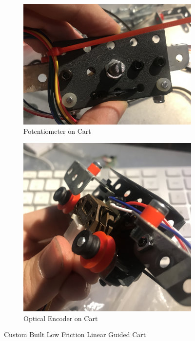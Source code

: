 \documentclass[12pt]{article}
\begin{document}
\begin{figure}[H]
\centering
\begin{subfigure}{.5\textwidth}
  \centering
  \includegraphics[width=1\linewidth]{figures/IMG_5874.jpg}
  \caption{Potentiometer on Cart}
  \label{fig:cart}
\end{subfigure}%
\begin{subfigure}{.36\textwidth}
  \centering
  \includegraphics[width=1\linewidth]{figures/IMG_5871.jpg}
  \caption{Optical Encoder on Cart}
  \label{fig:cart2}
\end{subfigure}
\caption{Custom Built Low Friction Linear Guided Cart}
\end{figure}
\end{document}
